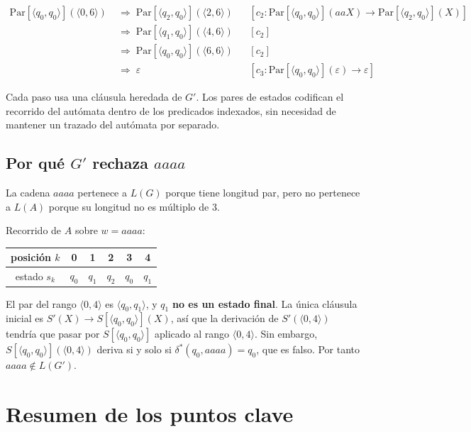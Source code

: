\documentclass[11pt, letterpaper]{article}
\theoremstyle{definition}
\newcommand{\eps}{\varepsilon}
\newcommand{\pair}[2]{\langle #1, #2 \rangle}
\newcommand{\trans}{\delta}
\newcommand{\hl}[1]{\textcolor{red!70!black}{\textbf{#1}}}
\newcommand{\Par}{\mathrm{Par}}
\begin{document}
\begin{align*}
\Par[\pair{q_0}{q_0}](\pair{0}{6}) \;&\Rightarrow\; \Par[\pair{q_2}{q_0}](\pair{2}{6})
   && [c_2: \Par[\pair{q_0}{q_0}](aaX) \to \Par[\pair{q_2}{q_0}](X)] \\
                                  \;&\Rightarrow\; \Par[\pair{q_1}{q_0}](\pair{4}{6})
   && [c_2] \\
                                  \;&\Rightarrow\; \Par[\pair{q_0}{q_0}](\pair{6}{6})
   && [c_2] \\
                                  \;&\Rightarrow\; \eps
   && [c_3: \Par[\pair{q_0}{q_0}](\eps) \to \eps]
\end{align*}

\begin{tcolorbox}
Cada paso usa una cláusula heredada de $G'$. Los pares de estados codifican el recorrido del autómata dentro de los predicados indexados, sin necesidad de mantener un trazado del autómata por separado.
\end{tcolorbox}

\subsection{Por qué $G'$ rechaza $aaaa$}

La cadena $aaaa$ pertenece a $L(G)$ porque tiene longitud par, pero no pertenece a $L(A)$ porque su longitud no es múltiplo de 3.

Recorrido de $A$ sobre $w = aaaa$:
\begin{center}
\begin{tabular}{c|ccccc}
posición $k$       & 0   & 1   & 2   & 3   & 4   \\
\hline
estado $s_k$       & $q_0$ & $q_1$ & $q_2$ & $q_0$ & $q_1$
\end{tabular}
\end{center}

El par del rango $\pair{0}{4}$ es $\pair{q_0}{q_1}$, y $q_1$ \hl{no es un estado final}. La única cláusula inicial es $S'(X) \to S[\pair{q_0}{q_0}](X)$, así que la derivación de $S'(\pair{0}{4})$ tendría que pasar por $S[\pair{q_0}{q_0}]$ aplicado al rango $\pair{0}{4}$. Sin embargo, $S[\pair{q_0}{q_0}](\pair{0}{4})$ deriva si y solo si $\trans^*(q_0, aaaa) = q_0$, que es falso. Por tanto $aaaa \notin L(G')$.

\section{Resumen de los puntos clave}
\end{document}

